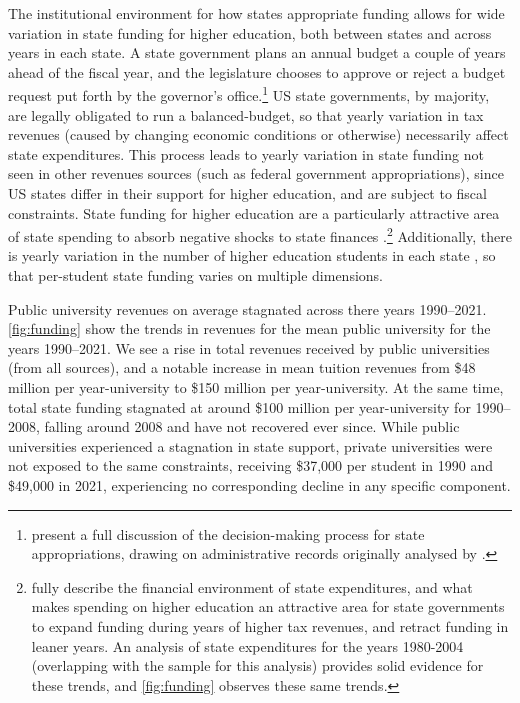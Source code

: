 The institutional environment for how states appropriate funding allows for wide variation in state funding for higher education, both between states and across years in each state.
A state government plans an annual budget a couple of years ahead of the fiscal year, and the legislature chooses to approve or reject a budget request put forth by the governor's office.\footnote{
    \cite{NBERw23736} present a full discussion of the decision-making process for state appropriations, drawing on administrative records originally analysed by \cite{parmley2009state}.
}
US state governments, by majority, are legally obligated to run a balanced-budget, so that yearly variation in tax revenues (caused by changing economic conditions or otherwise) necessarily affect state expenditures.
This process leads to yearly variation in state funding not seen in other revenues sources (such as federal government appropriations), since US states differ in their support for higher education, and are subject to fiscal constraints.
State funding for higher education are a particularly attractive area of state spending to absorb negative shocks to state finances \citep{delaney2011state}.\footnote{
    \cite{delaney2011state} fully describe the financial environment of state expenditures, and what makes spending on higher education an attractive area for state governments to expand funding during years of higher tax revenues, and retract funding in leaner years.
    An analysis of state expenditures for the years 1980-2004 (overlapping with the sample for this analysis) provides solid evidence for these trends, and \autoref{fig:funding} observes these same trends.
}
Additionally, there is yearly variation in the number of higher education students in each state \citep{turner2014impact}, so that per-student state funding varies on multiple dimensions.

Public university revenues on average stagnated across there years 1990--2021.
\autoref{fig:funding} show the trends in revenues for the mean public university for the years 1990--2021.
We see a rise in total revenues received by public universities (from all sources), and a notable increase in mean tuition revenues from \$48 million per year-university to \$150 million per year-university.
At the same time, total state funding stagnated at around \$100 million per year-university for 1990--2008, falling around 2008 and have not recovered ever since.
While public universities experienced a stagnation in state support, private universities were not exposed to the same constraints, receiving \$37,000 per student in 1990 and \$49,000 in 2021, experiencing no corresponding decline in any specific component.

